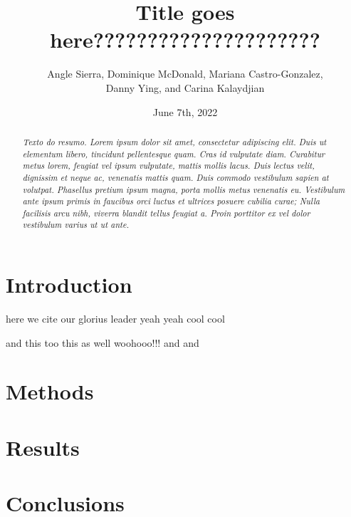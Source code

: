 \documentclass[11pt]{article}
\title {Title goes here?????????????????????\\[1ex]}
\author{
Angle Sierra, 
Dominique McDonald,
Mariana Castro-Gonzalez, \\
Danny Ying,
and Carina Kalaydjian \\[1ex]
}
\date{June 7th, 2022}
\newcommand{\abstractinenglishname}{Abstract}
\newenvironment{abstractinenglish}{
        \def\abstractname{\abstractinenglishname}
	\begin{abstract}
}{
        \end{abstract}
}
\begin{document}
\maketitle
\vspace{6pt}

\begin{abstractinenglish}
\emph{Texto do resumo. Lorem ipsum dolor sit amet, consectetur adipiscing elit. Duis ut elementum libero, tincidunt pellentesque quam. Cras id vulputate diam. Curabitur metus lorem, feugiat vel ipsum vulputate, mattis mollis lacus. Duis lectus velit, dignissim et neque ac, venenatis mattis quam. Duis commodo vestibulum sapien at volutpat. Phasellus pretium ipsum magna, porta mollis metus venenatis eu. Vestibulum ante ipsum primis in faucibus orci luctus et ultrices posuere cubilia curae; Nulla facilisis arcu nibh, viverra blandit tellus feugiat a. Proin porttitor ex vel dolor vestibulum varius ut ut ante.}
\end{abstractinenglish}

\section{Introduction}
here we cite \cite{web1} our glorius leader \cite{web2} yeah yeah cool cool \cite{briney2015data}

and this too \cite{monkey} this as well \cite{sonnetsData} woohooo!!! \cite{musicData} and \cite{syuzhet} and 

\section{Methods}

\section{Results}

\section{Conclusions}



\newpage{}



 
\end{document}

